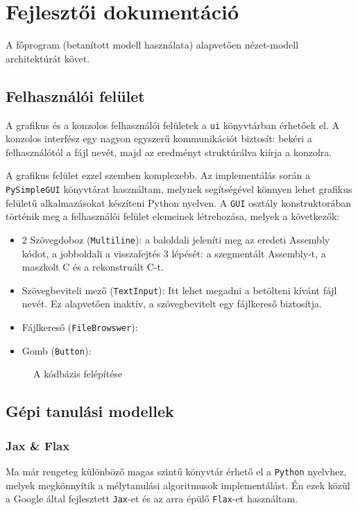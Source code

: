\chapter{Fejlesztői dokumentáció}
\label{ch:impl}

A főprogram (betanított modell használata) alapvetően nézet-modell
architektúrát követ.

\section{Felhasználói felület}
A grafikus és a konzolos felhasználói felületek a \texttt{ui} könyvtárban
érhetőek el. A konzolos interfész egy nagyon egyszerű kommunikációt biztosít:
bekéri a felhasználótól a fájl nevét, majd az eredményt struktúrálva kiírja
a konzolra.

A grafikus felület ezzel szemben komplexebb. Az implementálás során
a \texttt{PySimpleGUI}\cite{??} könyvtárat használtam, melynek segítségével
könnyen lehet grafikus felületű alkalmazásokat készíteni Python nyelven.
A \texttt{GUI} osztály konstruktorában történik meg a felhasználói felület
elemeinek létrehozása, melyek a következők:
\begin{itemize}
    \item 2 Szövegdoboz (\texttt{Multiline}): a baloldali jeleníti meg az
    eredeti Assembly kódot, a jobboldali a visszafejtés 3 lépését:
    a szegmentált Assembly-t, a maszkolt C és a rekonstruált C-t.
    \item Szövegbeviteli mező (\texttt{TextInput}): Itt lehet megadni
    a betölteni kívánt fájl nevét. Ez alapvetően inaktív, a szövegbevitelt egy
    fájlkereső biztosítja.
    \item Fájlkereső (\texttt{FileBrowswer}):
    \item Gomb (\texttt{Button}): 
\end{itemize}

\begin{figure}[H]
	\centering
	
	\caption{A kódbázis felépítése}
	\label{fig:file-system}
\end{figure}

\section{Gépi tanulási modellek}

\subsection{Jax \& Flax}
Ma már rengeteg különböző magas szintű könyvtár érhető el a \texttt{Python} nyelvhez, melyek 
megkönnyítik a mélytanulási algoritmusok implementálást. Én ezek közül a Google által fejlesztett \texttt
{Jax}-et\cite{jax2018github} és az arra épülő \texttt{Flax}-et\cite{flax2020github} használtam.

